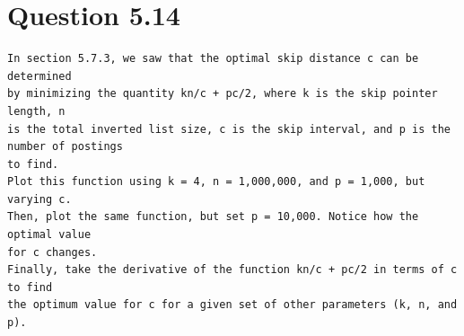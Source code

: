 \documentclass[11pt]{article}
\begin{document}
\section{Question 5.14}
\begin{verbatim}
In section 5.7.3, we saw that the optimal skip distance c can be determined
by minimizing the quantity kn/c + pc/2, where k is the skip pointer length, n
is the total inverted list size, c is the skip interval, and p is the number of postings
to find.
Plot this function using k = 4, n = 1,000,000, and p = 1,000, but varying c.
Then, plot the same function, but set p = 10,000. Notice how the optimal value
for c changes.
Finally, take the derivative of the function kn/c + pc/2 in terms of c to find
the optimum value for c for a given set of other parameters (k, n, and p).
\end{verbatim}
\end{document}
